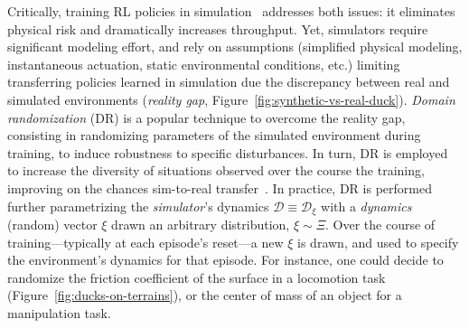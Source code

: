 Critically, training RL policies in simulation~\citep{tobinDomainRandomizationTransferring2017} addresses both issues: it eliminates physical risk and dramatically increases throughput. 
Yet, simulators require significant modeling effort, and rely on assumptions (simplified physical modeling, instantaneous actuation, static environmental conditions, etc.) limiting transferring policies learned in simulation due the discrepancy between real and simulated environments (\emph{reality gap}, Figure~\ref{fig:synthetic-vs-real-duck}).
\emph{Domain randomization} (DR) is a popular technique to overcome the reality gap, consisting in randomizing parameters of the simulated environment during training, to induce robustness to specific disturbances.
In turn, DR is employed to increase the diversity of situations observed over the course the training, improving on the chances sim-to-real transfer~\citep{akkayaSolvingRubiksCube2019,antonovaReinforcementLearningPivoting2017,jiDribbleBotDynamicLegged2023}.
In practice, DR is performed further parametrizing the \emph{simulator}'s dynamics \( \mathcal D \equiv \mathcal D_\xi \) with a \emph{dynamics} (random) vector \( \xi \) drawn an arbitrary distribution, \( \xi \sim \Xi \).
Over the course of training---typically at each episode's reset---a new \( \xi \) is drawn, and used to specify the environment's dynamics for that episode.
For instance, one could decide to randomize the friction coefficient of the surface in a locomotion task (Figure~\ref{fig:ducks-on-terrains}), or the center of mass of an object for a manipulation task.


